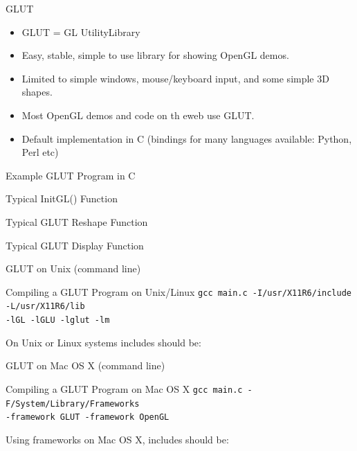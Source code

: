 \documentclass[aspectratio=1610,xcolor=dvipsnames,t]{beamer}
\newcommand{\showcode}[1]{\begin{mdframed}[style=code] %
                          \end{mdframed}%
}
\newcommand{\showsmallcode}[1]{\begin{mdframed}[style=code] %
                          \end{mdframed}%
}
\begin{document}
\begin{frame}{GLUT} 
    \begin{itemize} 
        \item GLUT = GL UtilityLibrary
        \item Easy, stable, simple to use library for showing OpenGL demos.
        \item Limited to simple windows, mouse/keyboard input, and some simple 3D shapes.
        \item Most OpenGL demos and code on th eweb use GLUT.
        \item Default implementation in C
             (bindings for many languages available: Python, Perl etc)
    \end{itemize} 
\end{frame} 

\begin{frame}{Example GLUT Program in C} 
    \showsmallcode{glutmain.c} 
\end{frame} 

\begin{frame}{Typical InitGL() Function} 
    \showsmallcode{initgl.c} 
\end{frame} 

\begin{frame}{Typical GLUT Reshape Function} 
    \showcode{reshape.c} 
\end{frame} 

\begin{frame}{Typical GLUT Display Function} 
    \showcode{display.c} 
\end{frame} 

\begin{frame}{GLUT on Unix (command line)}
    \begin{block}{Compiling a GLUT Program on Unix/Linux}
    \small
    \texttt{gcc main.c -I/usr/X11R6/include -L/usr/X11R6/lib \\ -lGL -lGLU -lglut -lm}
   \normalsize
   \end{block} 

    On Unix or Linux systems includes should be:
    \showcode{unixincludes.c} 
\end{frame} 

\begin{frame}{GLUT on Mac OS X (command line) } 
    \begin{block}{Compiling a GLUT Program on Mac OS X} 
    \small
    \texttt{gcc main.c -F/System/Library/Frameworks  \\ -framework GLUT -framework OpenGL}
    \normalsize
    \end{block} 

    Using frameworks on Mac OS X, includes should be:
    \showcode{macincludes.c} 
\end{frame} 
\end{document}
